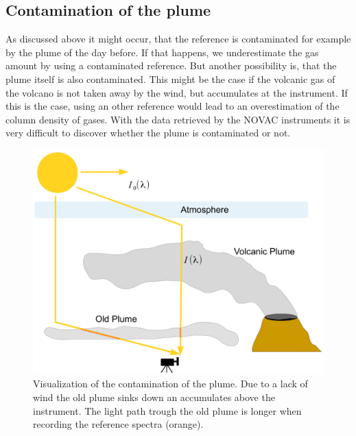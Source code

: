 \subsection{Contamination of the plume}
As discussed above it might occur, that the reference is contaminated for example by the plume of the day before.
If that happens, we underestimate the gas amount by using a contaminated reference. But another possibility is, that the plume itself is also contaminated. This might be the case if the volcanic gas of the volcano is not taken away by the wind, but accumulates at the instrument. If this is the case, using an other reference would lead to an overestimation of the column density of gases. With the data retrieved by the NOVAC instruments it is very difficult to discover whether the plume is contaminated or not. \\
%
%
\begin{figure}
	\centering
	\includegraphics[width=0.7\linewidth]{Bilder/Contaminationplume}
	\caption{Visualization of the contamination of the plume. Due to a lack of wind the old plume sinks down an accumulates
		above the instrument. The light path trough the old plume is longer when recording the reference spectra (orange).}
	\label{fig:contaminationplume}
\end{figure}
